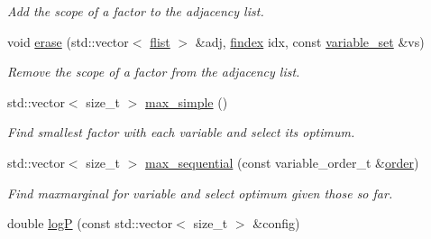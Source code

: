 \begin{DoxyCompactItemize}
\begin{DoxyCompactList}\small\item\em Add the scope of a factor to the adjacency list. \end{DoxyCompactList}\item 
void \hyperlink{classmerlin_1_1graphical__model_add6a62d0d4a2091944bf18ad108ff1ba}{erase} (std\+::vector$<$ \hyperlink{classmerlin_1_1graphical__model_a615e25ec6594615fddfd4c3c4776b99f}{flist} $>$ \&adj, \hyperlink{classmerlin_1_1graphical__model_ab2b46f09d8142bb68f243ecadbdabb6b}{findex} idx, const \hyperlink{classmerlin_1_1variable__set}{variable\+\_\+set} \&vs)
\begin{DoxyCompactList}\small\item\em Remove the scope of a factor from the adjacency list. \end{DoxyCompactList}\item 
std\+::vector$<$ size\+\_\+t $>$ \hyperlink{classmerlin_1_1graphical__model_ad1d7f268d7beb504a1e6ed79a1fca676}{max\+\_\+simple} ()\hypertarget{classmerlin_1_1graphical__model_ad1d7f268d7beb504a1e6ed79a1fca676}{}\label{classmerlin_1_1graphical__model_ad1d7f268d7beb504a1e6ed79a1fca676}

\begin{DoxyCompactList}\small\item\em Find smallest factor with each variable and select its optimum. \end{DoxyCompactList}\item 
std\+::vector$<$ size\+\_\+t $>$ \hyperlink{classmerlin_1_1graphical__model_a29f7fb295dea0c444de5fe03f1da1e91}{max\+\_\+sequential} (const variable\+\_\+order\+\_\+t \&\hyperlink{classmerlin_1_1graphical__model_a90bcf3fb02f0f43bf57520e834875c78}{order})\hypertarget{classmerlin_1_1graphical__model_a29f7fb295dea0c444de5fe03f1da1e91}{}\label{classmerlin_1_1graphical__model_a29f7fb295dea0c444de5fe03f1da1e91}

\begin{DoxyCompactList}\small\item\em Find {\itshape maxmarginal} for variable and select optimum given those so far. \end{DoxyCompactList}\item 
double \hyperlink{classmerlin_1_1graphical__model_aaf48222f85e0d6cbf1b289219953863f}{logP} (const std\+::vector$<$ size\+\_\+t $>$ \&config)\hypertarget{classmerlin_1_1graphical__model_aaf48222f85e0d6cbf1b289219953863f}{}\label{classmerlin_1_1graphical__model_aaf48222f85e0d6cbf1b289219953863f}


\end{DoxyCompactItemize}
